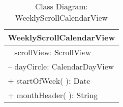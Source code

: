 \begin{table}[H]
\centering
\caption{Class Diagram: WeeklyScrollCalendarView}

\hspace{1em}
\renewcommand{\arraystretch}{1.7}

\begin{tabular}{|l|}
\hline
\textbf{WeeklyScrollCalendarView} \\
\hline
– scrollView: ScrollView \\
– dayCircle: CalendarDayView \\
\hdashline
+ startOfWeek( ): Date \\
+ monthHeader( ): String \\
\hline
\end{tabular}
\end{table}
